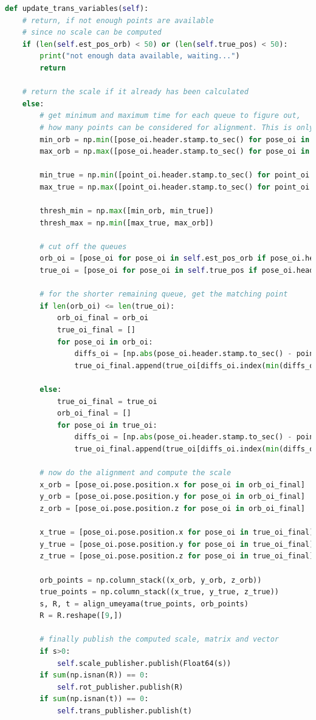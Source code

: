 \begin{lstlisting}[language=python, caption=Main part of the scale estimation node, label=lst:scaleup]
def update_trans_variables(self):
	# return, if not enough points are available
	# since no scale can be computed
	if (len(self.est_pos_orb) < 50) or (len(self.true_pos) < 50):
		print("not enough data available, waiting...")
		return

	# return the scale if it already has been calculated    
	else:
		# get minimum and maximum time for each queue to figure out, 
		# how many points can be considered for alignment. This is only done once!
		min_orb = np.min([pose_oi.header.stamp.to_sec() for pose_oi in self.est_pos_orb])
		max_orb = np.max([pose_oi.header.stamp.to_sec() for pose_oi in self.est_pos_orb])

		min_true = np.min([point_oi.header.stamp.to_sec() for point_oi in self.true_pos])
		max_true = np.max([point_oi.header.stamp.to_sec() for point_oi in self.true_pos])

		thresh_min = np.max([min_orb, min_true])
		thresh_max = np.min([max_true, max_orb])

		# cut off the queues
		orb_oi = [pose_oi for pose_oi in self.est_pos_orb if pose_oi.header.stamp.to_sec() > thresh_min]
		true_oi = [pose_oi for pose_oi in self.true_pos if pose_oi.header.stamp.to_sec() > thresh_min]

		# for the shorter remaining queue, get the matching point
		if len(orb_oi) <= len(true_oi): 
			orb_oi_final = orb_oi
			true_oi_final = []
			for pose_oi in orb_oi: 
				diffs_oi = [np.abs(pose_oi.header.stamp.to_sec() - point_oi.header.stamp.to_sec()) for point_oi in true_oi]
				true_oi_final.append(true_oi[diffs_oi.index(min(diffs_oi))])

		else:
			true_oi_final = true_oi
			orb_oi_final = []
			for pose_oi in true_oi: 
				diffs_oi = [np.abs(pose_oi.header.stamp.to_sec() - point_oi.header.stamp.to_sec()) for point_oi in orb_oi]
				true_oi_final.append(true_oi[diffs_oi.index(min(diffs_oi))])

		# now do the alignment and compute the scale
		x_orb = [pose_oi.pose.position.x for pose_oi in orb_oi_final]
		y_orb = [pose_oi.pose.position.y for pose_oi in orb_oi_final]
		z_orb = [pose_oi.pose.position.z for pose_oi in orb_oi_final]

		x_true = [pose_oi.pose.position.x for pose_oi in true_oi_final]
		y_true = [pose_oi.pose.position.y for pose_oi in true_oi_final]
		z_true = [pose_oi.pose.position.z for pose_oi in true_oi_final]
		
		orb_points = np.column_stack((x_orb, y_orb, z_orb))
		true_points = np.column_stack((x_true, y_true, z_true))
		s, R, t = align_umeyama(true_points, orb_points)
		R = R.reshape([9,])

		# finally publish the computed scale, matrix and vector
		if s>0:
			self.scale_publisher.publish(Float64(s))
		if sum(np.isnan(R)) == 0:
			self.rot_publisher.publish(R)
		if sum(np.isnan(t)) == 0:
			self.trans_publisher.publish(t)
\end{lstlisting}
	
